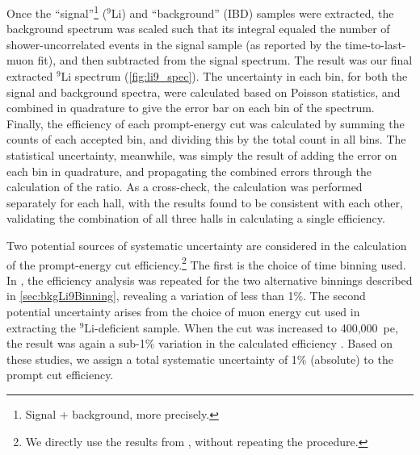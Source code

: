 \documentclass[../thesis.tex]{subfiles}
\begin{document}
Once the ``signal''\footnote{Signal + background, more precisely.} ($^9$Li) and ``background'' (IBD) samples were extracted, the background spectrum was scaled such that its integral equaled the number of shower-uncorrelated events in the signal sample (as reported by the time-to-last-muon fit), and then subtracted from the signal spectrum. The result was our final extracted $^9$Li spectrum (\autoref{fig:li9_spec}). The uncertainty in each bin, for both the signal and background spectra, were calculated based on Poisson statistics, and combined in quadrature to give the error bar on each bin of the spectrum. Finally, the efficiency of each prompt-energy cut was calculated by summing the counts of each accepted bin, and dividing this by the total count in all bins. The statistical uncertainty, meanwhile, was simply the result of adding the error on each bin in quadrature, and propagating the combined errors through the calculation of the ratio. As a cross-check, the calculation was performed separately for each hall, with the results found to be consistent with each other, validating the combination of all three halls in calculating a single efficiency.

Two potential sources of systematic uncertainty are considered in the calculation of the prompt-energy cut efficiency.\footnote{We directly use the results from \cite{ChrisLi9}, without repeating the procedure.} The first is the choice of time binning used. In \cite{ChrisLi9}, the efficiency analysis was repeated for the two alternative binnings described in \autoref{sec:bkgLi9Binning}, revealing a variation of less than 1\%. The second potential uncertainty arises from the choice of muon energy cut used in extracting the $^9$Li-deficient sample. When the cut was increased to 400,000~pe, the result was again a sub-1\% variation in the calculated efficiency \cite{ChrisLi9}. Based on these studies, we assign a total systematic uncertainty of 1\% (absolute) to the prompt cut efficiency.
\end{document}
